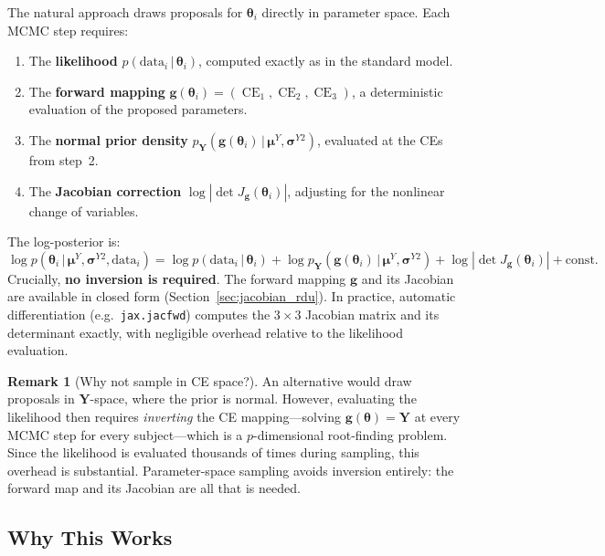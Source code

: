 \documentclass[11pt,a4paper]{article}
\theoremstyle{definition}
\newtheorem{remark}[theorem]{Remark}
\newcommand{\given}{\,|\,}
\newcommand{\btheta}{\boldsymbol{\theta}}
\newcommand{\bmu}{\boldsymbol{\mu}}
\DeclareMathOperator{\CE}{CE}
\begin{document}
The natural approach draws proposals for $\btheta_i$ directly in parameter
space. Each MCMC step requires:
\begin{enumerate}
    \item The \textbf{likelihood} $p(\text{data}_i \given \btheta_i)$, computed
    exactly as in the standard model.
    \item The \textbf{forward mapping} $\mathbf{g}(\btheta_i) = (\CE_1, \CE_2,
    \CE_3)$, a deterministic evaluation of the proposed parameters.
    \item The \textbf{normal prior density} $p_{\mathbf{Y}}(\mathbf{g}(\btheta_i)
    \given \bmu^Y, \bm{\sigma}^{Y2})$, evaluated at the CEs from step~2.
    \item The \textbf{Jacobian correction}
    $\log|\det J_{\mathbf{g}}(\btheta_i)|$, adjusting for the nonlinear
    change of variables.
\end{enumerate}
The log-posterior is:
\begin{equation}
    \label{eq:log_posterior_theta}
    \log p(\btheta_i \given \bmu^Y, \bm{\sigma}^{Y2}, \text{data}_i) =
    \log p(\text{data}_i \given \btheta_i) +
    \log p_{\mathbf{Y}}(\mathbf{g}(\btheta_i) \given \bmu^Y, \bm{\sigma}^{Y2})
    + \log \left|\det J_{\mathbf{g}}(\btheta_i)\right| + \text{const.}
\end{equation}
Crucially, \textbf{no inversion is required}. The forward mapping $\mathbf{g}$
and its Jacobian are available in closed form
(Section~\ref{sec:jacobian_rdu}). In practice, automatic differentiation
(e.g.\ \texttt{jax.jacfwd}) computes the $3 \times 3$ Jacobian matrix and its
determinant exactly, with negligible overhead relative to the likelihood
evaluation.

\begin{remark}[Why not sample in CE space?]
An alternative would draw proposals in $\mathbf{Y}$-space, where the prior is
normal. However, evaluating the likelihood then requires \emph{inverting} the
CE mapping---solving $\mathbf{g}(\btheta) = \mathbf{Y}$ at every MCMC step for
every subject---which is a $p$-dimensional root-finding problem. Since the
likelihood is evaluated thousands of times during sampling, this overhead is
substantial. Parameter-space sampling avoids inversion entirely: the forward
map and its Jacobian are all that is needed.
\end{remark}

\subsection{Why This Works}
\end{document}
